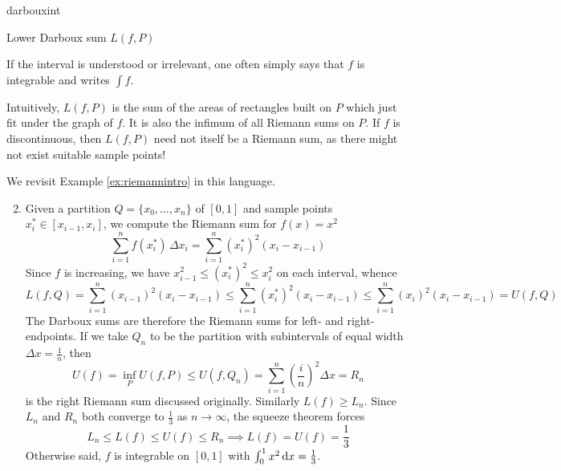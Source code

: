 \begin{defn}{}{darbouxint}
\begin{minipage}[t]{0.39\linewidth}
			Lower Darboux sum $L(f,P)$
		\end{minipage}\medbreak
	If the interval is understood or irrelevant, one often simply says that $f$ is integrable and writes $\int f$.
\end{defn}


Intuitively, $L(f,P)$ is the sum of the areas of rectangles built on $P$ which just fit under the graph of $f$. It is also the infimum of all Riemann sums on $P$. If $f$ is discontinuous, then $L(f,P)$ need not itself be a Riemann sum, as there might not exist suitable sample points!

\goodbreak

\begin{examples}{}{}
	\exstart We revisit Example \ref{ex:riemannintro} in this language.
	\begin{enumerate}\setcounter{enumi}{1}
	  \item[]Given a partition $Q=\{x_0,\ldots,x_n\}$ of $[0,1]$ and sample points $x_i^*\in[x_{i-1},x_i]$, we compute the Riemann sum for $f(x)=x^2$
		\[
			\sum_{i=1}^nf(x_i^*)\,\Delta x_i=\sum_{i=1}^n(x_i^*)^2(x_i-x_{i-1})
		\]
		Since $f$ is increasing,  we have $x_{i-1}^2\le (x_i^*)^2\le x_i^2$ on each interval, whence
		\[
			L(f,Q) =\sum_{i=1}^n(x_{i-1})^2(x_i-x_{i-1})
			\le\sum_{i=1}^n(x_i^*)^2(x_i-x_{i-1})
			\le\sum_{i=1}^n(x_i)^2(x_i-x_{i-1})=U(f,Q)
		\]
		The Darboux sums are therefore the Riemann sums for left- and right-endpoints.\smallbreak
		If we take $Q_n$ to be the partition with subintervals of equal width $\Delta x=\frac 1n$, then
		\[
			U(f)=\inf_P U(f,P)\le U(f,Q_n)
			=\sum_{i=1}^n\left(\frac in\right)^2\!\Delta x =R_n
		\]
		is the right Riemann sum discussed originally. Similarly $L(f)\ge L_n$. Since $L_n$ and $R_n$ both converge to $\frac 13$ as $n\to \infty$, the squeeze theorem forces
		\[
			L_n\le L(f)\le U(f)\le R_n
			\implies L(f)=U(f)=\frac 13
		\]
		Otherwise said, $f$ is integrable on $[0,1]$ with $\int_0^1x^2\,{\mathrm{d} x}=\frac 13$.


\end{enumerate}
\end{examples}
